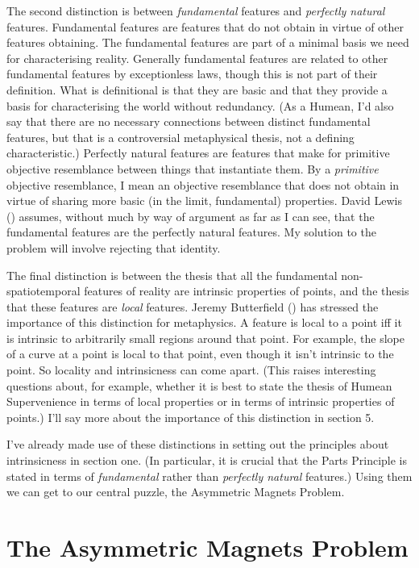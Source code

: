 \documentclass[
  10pt,
  letterpaper,
  DIV=11,
  numbers=noendperiod,
  twoside]{scrartcl}
\begin{document}
The second distinction is between \emph{fundamental} features and
\emph{perfectly natural} features. Fundamental features are features
that do not obtain in virtue of other features obtaining. The
fundamental features are part of a minimal basis we need for
characterising reality. Generally fundamental features are related to
other fundamental features by exceptionless laws, though this is not
part of their definition. What is definitional is that they are basic
and that they provide a basis for characterising the world without
redundancy. (As a Humean, I'd also say that there are no necessary
connections between distinct fundamental features, but that is a
controversial metaphysical thesis, not a defining characteristic.)
Perfectly natural features are features that make for primitive
objective resemblance between things that instantiate them. By a
\emph{primitive} objective resemblance, I mean an objective resemblance
that does not obtain in virtue of sharing more basic (in the limit,
fundamental) properties. David Lewis ()
assumes, without much by way of argument as far as I can see, that the
fundamental features are the perfectly natural features. My solution to
the problem will involve rejecting that identity.

The final distinction is between the thesis that all the fundamental
non-spatiotemporal features of reality are intrinsic properties of
points, and the thesis that these features are \emph{local} features.
Jeremy Butterfield () has stressed
the importance of this distinction for metaphysics. A feature is local
to a point iff it is intrinsic to arbitrarily small regions around that
point. For example, the slope of a curve at a point is local to that
point, even though it isn't intrinsic to the point. So locality and
intrinsicness can come apart. (This raises interesting questions about,
for example, whether it is best to state the thesis of Humean
Supervenience in terms of local properties or in terms of intrinsic
properties of points.) I'll say more about the importance of this
distinction in section 5.

I've already made use of these distinctions in setting out the
principles about intrinsicness in section one. (In particular, it is
crucial that the Parts Principle is stated in terms of
\emph{fundamental} rather than \emph{perfectly natural} features.) Using
them we can get to our central puzzle, the Asymmetric Magnets Problem.

\section{The Asymmetric Magnets
Problem}\label{the-asymmetric-magnets-problem}
\end{document}
